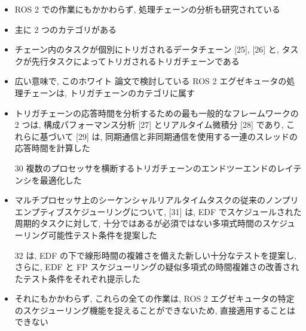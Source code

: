 \begin{frame}{}
    \begin{itemize}
        \item ROS 2 での作業にもかかわらず, 処理チェーンの分析も研究されている
\item 主に 2 つのカテゴリがある
\item チェーン内のタスクが個別にトリガされるデータチェーン [25], [26] と, タスクが先行タスクによってトリガされるトリガチェーンである
\item 広い意味で, このホワイト 論文で検討している ROS 2 エグゼキュータの処理チェーンは, トリガチェーンのカテゴリに属す
\item トリガチェーンの応答時間を分析するための最も一般的なフレームワークの 2 つは, 構成パフォーマンス分析 [27] とリアルタイム微積分 [28] であり, これらに基づいて [29] は, 同期通信と非同期通信を使用する一連のスレッドの応答時間を計算した
\item [30] 複数のプロセッサを横断するトリガチェーンのエンドツーエンドのレイテンシを最適化した
\item マルチプロセッサ上のシーケンシャルリアルタイムタスクの従来のノンプリエンプティブスケジューリングについて, [31] は, EDF でスケジュールされた周期的タスクに対して, 十分ではあるが必須ではない多項式時間のスケジューリング可能性テスト条件を提案した
\item [32] は, EDF の下で線形時間の複雑さを備えた新しい十分なテストを提案し, さらに, EDF と FP スケジューリングの疑似多項式の時間複雑さの改善されたテスト条件をそれぞれ提示した
\item それにもかかわらず, これらの全ての作業は, ROS 2 エグゼキュータの特定のスケジューリング機能を捉えることができないため, 直接適用することはできない
    \end{itemize}
\end{frame}
